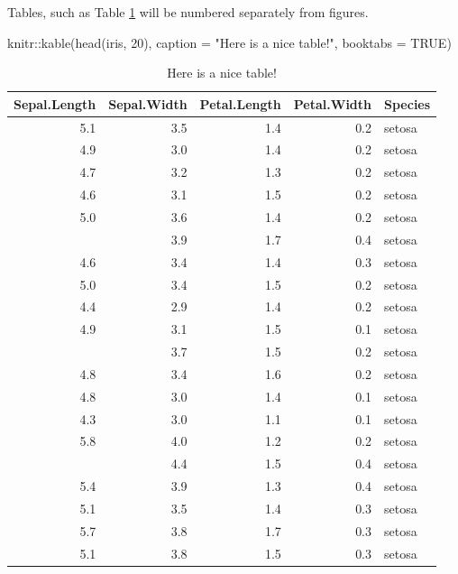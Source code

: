 \documentclass[
]{article}
\newenvironment{Shaded}{\begin{snugshade}}{\end{snugshade}}
\newcommand{\AttributeTok}[1]{\textcolor[rgb]{0.77,0.63,0.00}{#1}}
\newcommand{\ConstantTok}[1]{\textcolor[rgb]{0.00,0.00,0.00}{#1}}
\newcommand{\DecValTok}[1]{\textcolor[rgb]{0.00,0.00,0.81}{#1}}
\newcommand{\FunctionTok}[1]{\textcolor[rgb]{0.00,0.00,0.00}{#1}}
\newcommand{\NormalTok}[1]{#1}
\newcommand{\SpecialCharTok}[1]{\textcolor[rgb]{0.00,0.00,0.00}{#1}}
\newcommand{\StringTok}[1]{\textcolor[rgb]{0.31,0.60,0.02}{#1}}
\begin{document}
Tables, such as Table \ref{tab:test-tab} will be numbered separately from figures.

\begin{Shaded}
\begin{Highlighting}[]
\NormalTok{knitr}\SpecialCharTok{::}\FunctionTok{kable}\NormalTok{(}\FunctionTok{head}\NormalTok{(iris, }\DecValTok{20}\NormalTok{), }\AttributeTok{caption =} \StringTok{"Here is a nice table!"}\NormalTok{, }\AttributeTok{booktabs =} \ConstantTok{TRUE}\NormalTok{)}
\end{Highlighting}
\end{Shaded}

\begin{table}

\caption{\label{tab:test-tab}Here is a nice table!}
\centering
\begin{tabular}[t]{rrrrl}
\toprule
Sepal.Length & Sepal.Width & Petal.Length & Petal.Width & Species\\
\midrule
5.1 & 3.5 & 1.4 & 0.2 & setosa\\
4.9 & 3.0 & 1.4 & 0.2 & setosa\\
4.7 & 3.2 & 1.3 & 0.2 & setosa\\
4.6 & 3.1 & 1.5 & 0.2 & setosa\\
5.0 & 3.6 & 1.4 & 0.2 & setosa\\
\addlinespace
5.4 & 3.9 & 1.7 & 0.4 & setosa\\
4.6 & 3.4 & 1.4 & 0.3 & setosa\\
5.0 & 3.4 & 1.5 & 0.2 & setosa\\
4.4 & 2.9 & 1.4 & 0.2 & setosa\\
4.9 & 3.1 & 1.5 & 0.1 & setosa\\
\addlinespace
5.4 & 3.7 & 1.5 & 0.2 & setosa\\
4.8 & 3.4 & 1.6 & 0.2 & setosa\\
4.8 & 3.0 & 1.4 & 0.1 & setosa\\
4.3 & 3.0 & 1.1 & 0.1 & setosa\\
5.8 & 4.0 & 1.2 & 0.2 & setosa\\
\addlinespace
5.7 & 4.4 & 1.5 & 0.4 & setosa\\
5.4 & 3.9 & 1.3 & 0.4 & setosa\\
5.1 & 3.5 & 1.4 & 0.3 & setosa\\
5.7 & 3.8 & 1.7 & 0.3 & setosa\\
5.1 & 3.8 & 1.5 & 0.3 & setosa\\
\bottomrule
\end{tabular}
\end{table}
\end{document}
